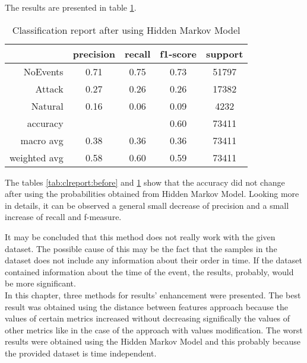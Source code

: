 The results are presented in table \ref{tab:hmm}.

\begin{table}[H]
    \centering
    \caption{Classification report after using Hidden Markov Model} \label{tab:hmm}
    \begin{tabular}{rcccc}\toprule
       & precision &   recall & f1-score  & support \\\midrule

        NoEvents    &   0.71    &  0.75  &    0.73     &51797\\
          Attack     &  0.27    &  0.26  &    0.26 &   17382\\
         Natural    &   0.16  &    0.06    &  0.09  &    4232\\
    
        accuracy     &          &         &   0.60   &  73411\\
       macro avg     &  0.38    &  0.36   &   0.36  &   73411\\
    weighted avg    &   0.58    &  0.60   &   0.59  &   73411   \\ \bottomrule   
    \end{tabular}
\end{table}

The tables \ref{tab:clreport:before} and \ref{tab:hmm} show that the accuracy did not change after using the probabilities obtained from Hidden Markov Model. Looking more in details, it can be observed a general small decrease of precision and a small increase of recall and f-measure. 

It may be concluded that this method does not really work with the given dataset. The possible cause of this may be the fact that the samples in the dataset does not include any information about their order in time. If the dataset contained information about the time of the event, the results, probably, would be more significant. \\

In this chapter, three methods for results' enhancement were presented. The best result was obtained using the distance between features approach because the values of certain metrics increased without decreasing significally the values of other metrics like in the case of the approach with values modification. The worst results were obtained using the Hidden Markov Model and this probably because the provided dataset is time independent. 